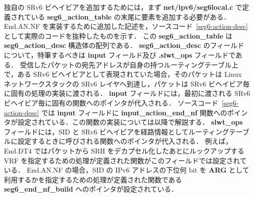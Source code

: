 独自の SRv6 ビヘイビアを追加するためには，まず \textbf{net/ipv6/seg6local.c} で定義されている \textbf{seg6\_action\_table} の末尾に要素を追加する必要がある．
End.AN.NF を実装するために追加した記述を，ソースコード~\ref*{seg6-action-desc} として実際のコードを抜粋したものを示す．
この \textbf{seg6\_action\_table} は \textbf{seg6\_action\_desc} 構造体の配列である．
\textbf{seg6\_action\_desc} のフィールドについて，特筆するべきは \textbf{input} フィールド及び \textbf{.slwt\_ops} フィールドである．
受信したパケットの宛先アドレスが自身の持つルーティングテーブル上で，ある SRv6 ビヘイビアとして表現されていた場合，そのパケットは Linux ネットワークスタックの SRv6 レイヤへ到達し，パケットは SRv6 ビヘイビア毎に固有の処理の実装に渡される．
\textbf{input} フィールドには，最初に渡される SRv6 ビヘイビア毎に固有の関数へのポインタが代入される．
ソースコード~\ref*{seg6-action-desc} では \textbf{input} フィールドに \textbf{input\_action\_end\_nf} 関数へのポインタが設定されている．この関数の実装については以降で解説する．
\textbf{slwt\_ops} フィールドには，SID と SRv6 ビヘイビアを経路情報としてルーティングテーブルに設定するときに呼びされる関数へのポインタが代入される．
例えば，End.DT4 ではパケットから SRH をデカプセル化したあとにルックアップする VRF を指定するための処理が定義された関数がこのフィールドでは設定されている．
End.AN.NF の場合，SID の IPv6 アドレスの下位何 bit を \textbf{ARG} として利用するかを指定するための処理が定義された関数である \textbf{seg6\_end\_nf\_build} へのポインタが設定されている．

